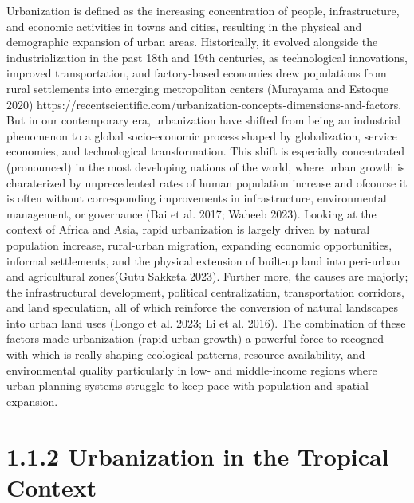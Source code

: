Urbanization is defined as the increasing concentration of people, infrastructure, and economic activities in towns and cities, resulting in the physical and demographic expansion of urban areas. Historically, it evolved alongside the industrialization in the past 18th and 19th centuries, as technological innovations, improved transportation, and factory-based economies drew populations from rural settlements into emerging metropolitan centers (Murayama and Estoque 2020) https://recentscientific.com/urbanization-concepts-dimensions-and-factors. But in our contemporary era, urbanization have shifted from being an industrial phenomenon to a global socio-economic process shaped by globalization, service economies, and technological transformation. This shift is especially concentrated (pronounced) in the most developing nations of the world, where urban growth is charaterized by unprecedented rates of human population increase and ofcourse it is often without corresponding improvements in infrastructure, environmental management, or governance (Bai et al. 2017; Waheeb 2023). Looking at the context of Africa and Asia, rapid urbanization is largely driven by natural population increase, rural-urban migration, expanding economic opportunities, informal settlements, and the physical extension of built-up land into peri-urban and agricultural zones(Gutu Sakketa 2023). Further more, the causes are majorly; the infrastructural development, political centralization, transportation corridors, and land speculation, all of which reinforce the conversion of natural landscapes into urban land uses (Longo et al. 2023; Li et al. 2016). The combination of these factors made urbanization (rapid urban growth) a powerful force to recogned with which is really shaping ecological patterns, resource availability, and environmental quality particularly in low- and middle-income regions where urban planning systems struggle to keep pace with population and spatial expansion.
\hypertarget{urbanization-in-the-tropical-context}{%
\section{\texorpdfstring{\textbf{1.1.2 Urbanization in the Tropical Context}}{1.1.2 Urbanization in the Tropical Context}}\label{urbanization-in-the-tropical-context}}

